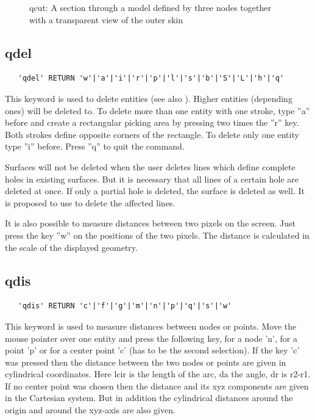 \documentclass{article}
\begin{document}
\begin{figure}[h]
\caption{\label{qcutp}qcut: A section through a model defined by three nodes together with a transparent view of the outer skin}
\end{figure}

\subsection{\label{qdel}qdel}
\begin{verbatim}
   'qdel' RETURN 'w'|'a'|'i'|'r'|'p'|'l'|'s'|'b'|'S'|'L'|'h'|'q' 
\end{verbatim}
This keyword is used to delete entities (see also ). Higher entities (depending ones) will be deleted to. To delete more than one entity with one stroke, type ''a'' before and create a rectangular picking area by pressing two times the ''r'' key. Both strokes define opposite corners of the rectangle. To delete only one entity type ''i'' before. Press ''q'' to quit the command.

Surfaces will not be deleted when the user deletes lines which define complete holes in existing surfaces. But it is necessary that all lines of a certain hole are deleted at once. If only a partial hole is deleted, the surface is deleted as well. It is proposed to use  to delete the affected lines. 

It is also possible to measure distances between two pixels on the screen. Just press the key ''w'' on the positions of the two pixels. The distance is calculated in the scale of the displayed geometry.

\subsection{\label{qdis}qdis}
\begin{verbatim}
   'qdis' RETURN 'c'|'f'|'g'|'m'|'n'|'p'|'q'|'s'|'w' 
\end{verbatim}
This keyword is used to measure distances between nodes or points. Move the mouse pointer over one entity and press the following key, for a node 'n', for a point 'p' or for a center point 'c' (has to be the second selection). If the key 'c' was pressed then the distance between the two nodes or points are given in cylindrical coordinates. Here lcir is the length of the arc, da the angle, dr is r2-r1. If no center point was chosen then the distance and its xyz components are given in the Cartesian system. But in addition the cylindrical distances around the origin and around the xyz-axis are also given.
\end{document}
